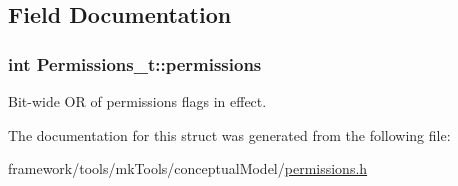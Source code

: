\subsection{Field Documentation}
\subsubsection[{\texorpdfstring{permissions}{permissions}}]{\setlength{\rightskip}{0pt plus 5cm}int Permissions\+\_\+t\+::permissions\hspace{0.3cm}{\ttfamily [private]}}\hypertarget{struct_permissions__t_a35bf4571b0a4861f281fc7cad753881e}{}\label{struct_permissions__t_a35bf4571b0a4861f281fc7cad753881e}


Bit-\/wide OR of permissions flags in effect. 



The documentation for this struct was generated from the following file\+:\begin{DoxyCompactItemize}
\item 
framework/tools/mk\+Tools/conceptual\+Model/\hyperlink{permissions_8h}{permissions.\+h}\end{DoxyCompactItemize}
